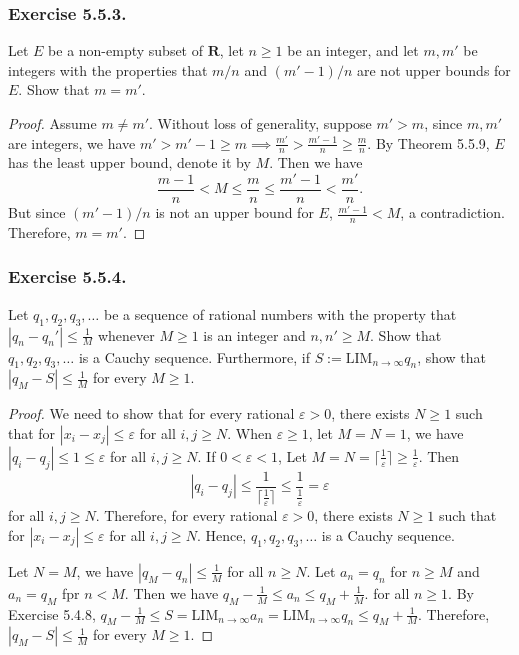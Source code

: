 \documentclass[12pt, letter]{article}
\begin{document}
\subsubsection*{Exercise 5.5.3.}
Let $E$ be a non-empty subset of $\mathbf{R}$, let $n\geq 1$ be an integer, and let $m,m'$ be integers with the properties that $m/n$ and $(m'-1)/n$ are not upper bounds for $E$.
Show that $m=m'$.
\begin{proof}
    Assume $m\ne m'$. Without loss of generality, suppose $m'>m$, since $m,m'$ are integers, we have $m'>m'-1\geq m\implies\frac{m'}{n}>\frac{m'-1}{n}\geq\frac{m}{n}$. By Theorem 5.5.9, $E$ has the least upper bound, denote it by $M$.
    Then we have 
    \begin{equation*}
        \frac{m-1}{n}<M\leq \frac{m}{n}\leq\frac{m'-1}{n}<\frac{m'}{n}.
    \end{equation*}
    But since $(m'-1)/n$ is not an upper bound for $E$, $\frac{m'-1}{n}<M$, a contradiction. Therefore, $m=m'$.
\end{proof}
\subsubsection*{Exercise 5.5.4.}
Let $q_1,q_2,q_3,\dotsc $ be a sequence of rational numbers with the property that $|q_n-q_n'|\leq \frac{1}{M}$ whenever $M\geq 1$ is an integer and $n,n'\geq M$.
Show that $q_1,q_2,q_3,\dotsc$ is a Cauchy sequence. Furthermore, if $S:=\text{LIM}_{n\to\infty}q_n$, show that $|q_M-S|\leq\frac{1}{M}$ for every $M\geq 1$.
\begin{proof}
    We need to show that for every rational $\varepsilon>0$, there exists $N\geq 1$ such that for $|x_i-x_j|\leq \varepsilon$ for all $i,j\geq N$. When 
    $\varepsilon\geq 1$, let $M=N=1$, we have $|q_i-q_j|\leq 1\leq\varepsilon$ for all $i,j\geq N$. If $0<\varepsilon<1$, Let $M=N=\lceil \frac{1}{\varepsilon}\rceil \geq \frac{1}{\varepsilon}$. 
    Then 
    \begin{equation*}
        |q_i-q_j|\leq \frac{1}{\lceil \frac{1}{\varepsilon}\rceil}\leq\frac{1}{\frac{1}{\varepsilon}}=\varepsilon
    \end{equation*}
    for all $i,j\geq N$. 
    Therefore, for every rational $\varepsilon>0$, there exists $N\geq 1$ such that for $|x_i-x_j|\leq \varepsilon$ for all $i,j\geq N$. Hence, $q_1,q_2,q_3,\dotsc$ is a Cauchy sequence.

    Let $N=M$, we have $|q_M-q_n|\leq\frac{1}{M}$ for all $n\geq N$. Let $a_n=q_n$ for $n\geq M$ and $a_n=q_M$ fpr $n<M$. Then we have $q_M-\frac{1}{M}\leq a_n\leq q_M+\frac{1}{M}$.
    for all $n\geq 1$. By Exercise 5.4.8, $q_M-\frac{1}{M}\leq S=\text{LIM}_{n\to\infty}a_n=\text{LIM}_{n\to\infty}q_n\leq q_M+\frac{1}{M}$. Therefore, $|q_M-S|\leq\frac{1}{M}$
    for every $M\geq 1$.
\end{proof}
\end{document}
